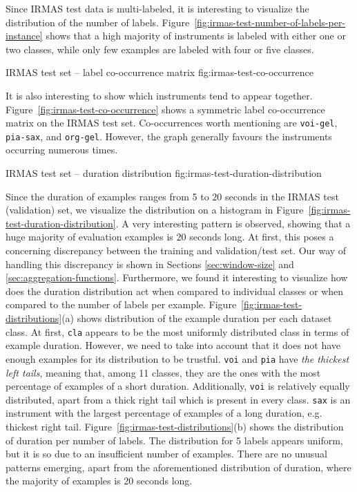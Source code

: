 Since IRMAS test data is multi-labeled, it is interesting to visualize the distribution of the number of labels. Figure~\ref{fig:irmas-test-number-of-labels-per-instance} shows that a high majority of instruments is labeled with either one or two classes, while only few examples are labeled with four or five classes.

			{IRMAS test set -- label co-occurrence matrix}
			{fig:irmas-test-co-occurrence}

It is also interesting to show which instruments tend to appear together. Figure~\ref{fig:irmas-test-co-occurrence} shows a symmetric label co-occurrence matrix on the IRMAS test set. Co-occurrences worth mentioning are \texttt{voi-gel}, \texttt{pia-sax}, and \texttt{org-gel}. However, the graph generally favours the instruments occurring numerous times.

	        {IRMAS test set -- duration distribution}
                {fig:irmas-test-duration-distribution}

Since the duration of examples ranges from 5 to 20 seconds in the IRMAS test (validation) set, we visualize the distribution on a histogram in Figure~\ref{fig:irmas-test-duration-distribution}. A very interesting pattern is observed, showing that a huge majority of evaluation examples is 20 seconds long. At first, this poses a concerning discrepancy between the training and validation/test set. Our way of handling this discrepancy is shown in Sections \ref{sec:window-size} and \ref{sec:aggregation-functions}.
Furthermore, we found it interesting to visualize how does the duration distribution act when compared to individual classes or when compared to the number of labels per example. Figure~\ref{fig:irmas-test-distributions}(a) shows distribution of the example duration per each dataset class. At first, \texttt{cla} appears to be the most uniformly distributed class in terms of example duration. However, we need to take into account that it does not have enough examples for its distribution to be trustful. \texttt{voi} and \texttt{pia} have \textit{the thickest left tails}, meaning that, among 11 classes, they are the ones with the most percentage of examples of a short duration. Additionally, \texttt{voi} is relatively equally distributed, apart from a thick right tail which is present in every class. \texttt{sax} is an instrument with the largest percentage of examples of a long duration, e.g. thickest right tail. Figure~\ref{fig:irmas-test-distributions}(b) shows the distribution of duration per number of labels. The distribution for 5 labels appears uniform, but it is so due to an insufficient number of examples. There are no unusual patterns emerging, apart from the aforementioned distribution of duration, where the majority of examples is 20 seconds long. 

